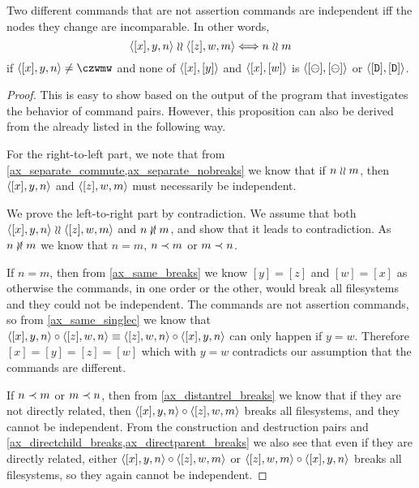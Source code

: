 \begin{mylem}
Two different commands that are not assertion commands are independent iff the nodes they change are incomparable. In other words,
\[ \langle{[x],y,n}\rangle\mathrel{\wr\wr}\langle{[z],w,m}\rangle \Longleftrightarrow n\mathrel{\wr\wr} m \]
if $\cxynv\neq\czwmw$ and none of $\langle{[x],[y]}\rangle$ and $\langle{[x],[w]}\rangle$ is $\langle{[\ominus],[\ominus]}\rangle$ or $\langle{[\mathtt{D}],[\mathtt{D}]}\rangle$.
\end{mylem}
\begin{proof}
This is easy to show based on the output of the program that investigates the behavior of command pairs.
However, this proposition can also be derived from the  already listed
in the following way.

For the right-to-left part, we note that
from \cref{ax_separate_commute,ax_separate_nobreaks} we know that
if $n\mathrel{\wr\wr} m$, then $\langle{[x],y,n}\rangle$ and $\langle{[z],w,m}\rangle$ must necessarily be independent.

We prove the left-to-right part by contradiction.
We assume that both $\langle{[x],y,n}\rangle\mathrel{\wr\wr}\langle{[z],w,m}\rangle$ and $n\nunrel m$,
and show that it leads to contradiction.
As $n\nunrel m$
we know that $n=m$, $n\prec m$ or $m\prec n$.

If $n=m$, then from \cref{ax_same_breaks} we know $[y]=[z]$ and $[w]=[x]$
as otherwise the commands, in one order or the other, would break all filesystems
and they could not be independent.
The commands are not assertion commands, so from \cref{ax_same_singlec}
we know that $\langle{[x],y,n}\rangle\mathbin{\circ}\langle{[z],w,n}\rangle\equiv\langle{[z],w,n}\rangle\mathbin{\circ}\langle{[x],y,n}\rangle$ can only happen if $y=w$.
Therefore $[x]=[y]=[z]=[w]$ which with $y=w$ contradicts our assumption that the commands are different.

If $n\prec m$ or $m\prec n$, then
from \cref{ax_distantrel_breaks} we know that if they are not directly related,
then $\langle{[x],y,n}\rangle\mathbin{\circ}\langle{[z],w,m}\rangle$ breaks all filesystems, and they cannot be independent.
From the construction and destruction pairs and 
\cref{ax_directchild_breaks,ax_directparent_breaks} we also see that
even if they are directly related, either
$\langle{[x],y,n}\rangle\mathbin{\circ}\langle{[z],w,m}\rangle$ or $\langle{[z],w,m}\rangle\mathbin{\circ}\langle{[x],y,n}\rangle$ 
breaks all filesystems, so they again cannot be independent.
\end{proof}

